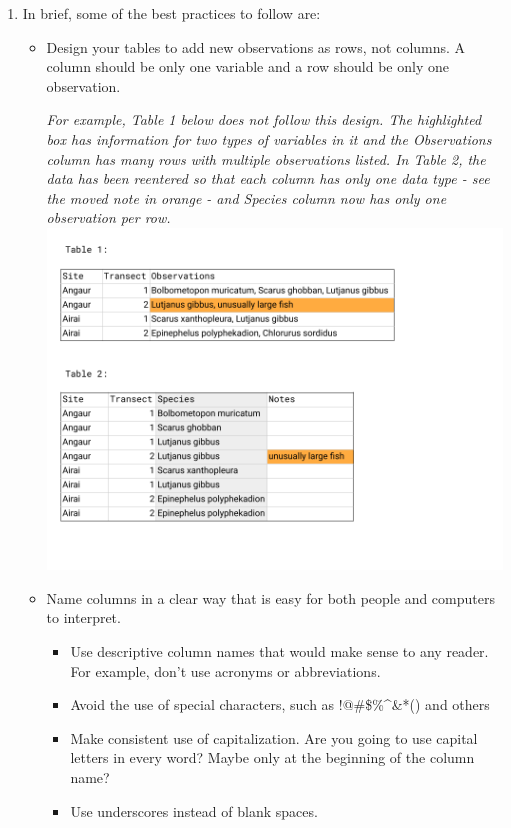 \documentclass[
]{book}
\begin{document}
\begin{enumerate}
\def\labelenumi{\arabic{enumi}.}
\item
  In brief, some of the best practices to follow are:

  \begin{itemize}
  \item
    Design your tables to add new observations as rows, not columns. A column should be only one variable and a row should be only one observation.

    \emph{For example, Table 1 below does not follow this design. The highlighted box has information for two types of variables in it and the Observations column has many rows with multiple observations listed. In Table 2, the data has been reentered so that each column has only one data type - see the moved note in orange - and Species column now has only one observation per row.}
    \includegraphics{images/M2S2_image1_observations_in_rows_and_columns.png}
  \item
    Name columns in a clear way that is easy for both people and computers to interpret.

    \begin{itemize}
    \item
      Use descriptive column names that would make sense to any reader. For example, don't use acronyms or abbreviations.
    \item
      Avoid the use of special characters, such as !@\#\$\%\^{}\&*() and others
    \item
      Make consistent use of capitalization. Are you going to use capital letters in every word? Maybe only at the beginning of the column name?
    \item
      Use underscores instead of blank spaces.


\end{itemize}
\end{itemize}
\end{enumerate}
\end{document}
